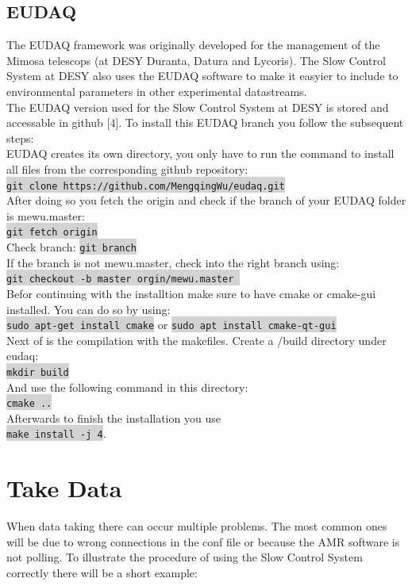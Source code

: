 \documentclass[a4paper,12pt]{scrartcl}
\begin{document}
\subsection{EUDAQ}
The EUDAQ framework was originally developed for the management of the Mimosa telescops (at DESY Duranta, Datura and Lycoris). The Slow Control System at DESY also uses the EUDAQ software to make it easyier to include to environmental parameters in other experimental datastreams. \\
The EUDAQ version used for the Slow Control System at DESY is stored and accessable in github [4]. To install this EUDAQ branch you follow the subsequent steps: \\
EUDAQ creates its own directory, you only have to run the command to install all files from the corresponding github repository: \\
\colorbox{lightgray}{\texttt{git clone https://github.com/MengqingWu/eudaq.git}} \\
After doing so you fetch the origin and check if the branch of your EUDAQ folder is mewu.master: \\
\colorbox{lightgray}{\texttt{git fetch origin}} \\
Check branch: \colorbox{lightgray}{\texttt{git branch}} \\
If the branch is not mewu.master, check into the right branch using: \\
\colorbox{lightgray}{\texttt{git checkout -b master orgin/mewu.master
}} \\
Befor continuing with the installtion make sure to have cmake or cmake-gui installed. You can do so by using:\\
\colorbox{lightgray}{\texttt{sudo apt-get install cmake}} or \colorbox{lightgray}{\texttt{sudo apt install cmake-qt-gui}}\\
Next of is the compilation with the makefiles. Create a /build directory under eudaq: \\
\colorbox{lightgray}{\texttt{mkdir build}} \\
And use the following command in this directory: \\
\colorbox{lightgray}{\texttt{cmake ..}} \\
Afterwards to finish the installation you use \\
\colorbox{lightgray}{\texttt{make install -j 4}}. \\

\section{Take Data}
When data taking there can occur multiple problems. The most common ones will be due to wrong connections in the conf file or because the AMR software is not polling. To illustrate the procedure of using the Slow Control System correctly there will be a short example:
\end{document}
